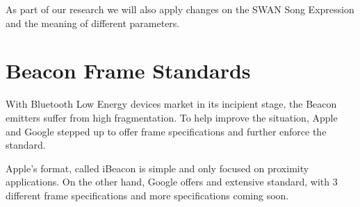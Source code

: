 As part of our research we will also apply changes on the SWAN Song Expression and the meaning of different parameters.

\section{Beacon Frame Standards}
With Bluetooth Low Energy devices market in its incipient stage, the Beacon  emitters suffer from high fragmentation.
To help improve the situation, Apple and Google stepped up to offer frame specifications and further enforce the standard.

Apple's format, called iBeacon is simple and only focused on proximity applications.
On the other hand, Google offers and extensive standard, with 3 different frame specifications and more specifications coming soon.
